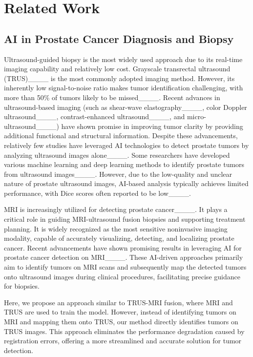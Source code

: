 \section{Related Work}
\subsection{AI in Prostate Cancer Diagnosis and Biopsy}
Ultrasound-guided biopsy is the most widely used approach due to its real-time imaging capability and relatively low cost. Grayscale transrectal ultrasound (TRUS)____ is the most commonly adopted imaging method. However, its inherently low signal-to-noise ratio makes tumor identification challenging, with more than 50\% of tumors likely to be missed____. Recent advances in ultrasound-based imaging (such as shear-wave elastography____, color Doppler ultrasound____, contrast-enhanced ultrasound____, and micro-ultrasound____) have shown promise in improving tumor clarity by providing additional functional and structural information. Despite these advancements, relatively few studies have leveraged AI technologies to detect prostate tumors by analyzing ultrasound images alone____. Some researchers have developed various machine learning and deep learning methods to identify prostate tumors from ultrasound images____. However, due to the low-quality and unclear nature of prostate ultrasound images, AI-based analysis typically achieves limited performance, with Dice scores often reported to be low____.

MRI is increasingly utilized for detecting prostate cancer____. It plays a critical role in guiding MRI-ultrasound fusion biopsies and supporting treatment planning. It is widely recognized as the most sensitive noninvasive imaging modality, capable of accurately visualizing, detecting, and localizing prostate cancer. Recent advancements have shown promising results in leveraging AI for prostate cancer detection on MRI____. These AI-driven approaches primarily aim to identify tumors on MRI scans and subsequently map the detected tumors onto ultrasound images during clinical procedures, facilitating precise guidance for biopsies.

Here, we propose an approach similar to TRUS-MRI fusion, where MRI and TRUS are used to train the model. However, instead of identifying tumors on MRI and mapping them onto TRUS, our method directly identifies tumors on TRUS images. This approach eliminates the performance degradation caused by registration errors, offering a more streamlined and accurate solution for tumor detection.

